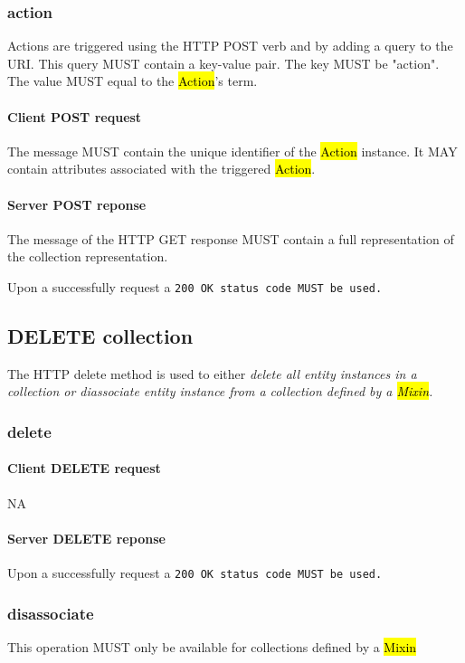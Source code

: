 \documentclass[10pt,a4paper]{article}
\begin{document}
\subsubsection{action}
Actions are triggered using the HTTP POST verb and by adding a query to the URI. This query MUST contain a key-value pair. The key MUST be "action". The value MUST equal to the \hl{Action}'s term.

\paragraph{Client POST request}
The message MUST contain the unique identifier of the \hl{Action} instance. It MAY contain attributes associated with the triggered \hl{Action}.

\paragraph{Server POST reponse}
The message of the HTTP GET response MUST contain a full representation of the collection representation.

Upon a successfully request a \tt{200 OK} status code MUST be used.

\subsection{DELETE collection}
The HTTP delete method is used to either \em{delete} all entity instances in a collection or \em{diassociate} entity instance from a collection defined by a \hl{Mixin}.

\subsubsection{delete}

\paragraph{Client DELETE request}
NA

\paragraph{Server DELETE reponse}
Upon a successfully request a \tt{200 OK} status code MUST be used.

\subsubsection{disassociate}
This operation MUST only be available for collections defined by a \hl{Mixin}
\end{document}
